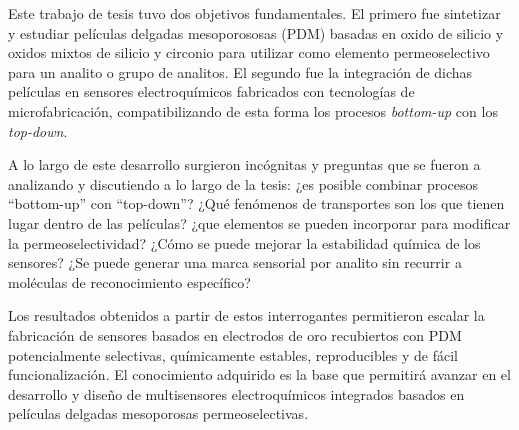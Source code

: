 Este trabajo de tesis tuvo dos objetivos fundamentales. El primero fue sintetizar y estudiar películas delgadas mesoporososas (PDM) basadas en oxido de silicio y oxidos mixtos de silicio y circonio para utilizar como elemento permeoselectivo para un analito o grupo de analitos. El segundo fue la integración de dichas películas en sensores electroquímicos fabricados con tecnologías de microfabricación, compatibilizando de esta forma los procesos \textit{bottom-up} con los \textit{top-down}.

A lo largo de este desarrollo surgieron incógnitas y preguntas que se fueron a analizando y discutiendo a lo largo de la tesis: ¿es posible combinar procesos ``bottom-up'' con ``top-down''? ¿Qué fenómenos de transportes son los que tienen lugar dentro de las películas? ¿que elementos se pueden incorporar para modificar la permeoselectividad? ¿Cómo se puede mejorar la estabilidad química de los sensores? ¿Se puede generar una marca sensorial por analito sin recurrir a moléculas de reconocimiento específico?

Los resultados obtenidos a partir de estos interrogantes permitieron escalar la fabricación de sensores basados en electrodos de oro recubiertos con PDM potencialmente selectivas, químicamente estables, reproducibles y de fácil funcionalización. El conocimiento adquirido es la base que permitirá avanzar en el desarrollo y diseño de multisensores electroquímicos integrados basados en películas delgadas mesoporosas permeoselectivas.

